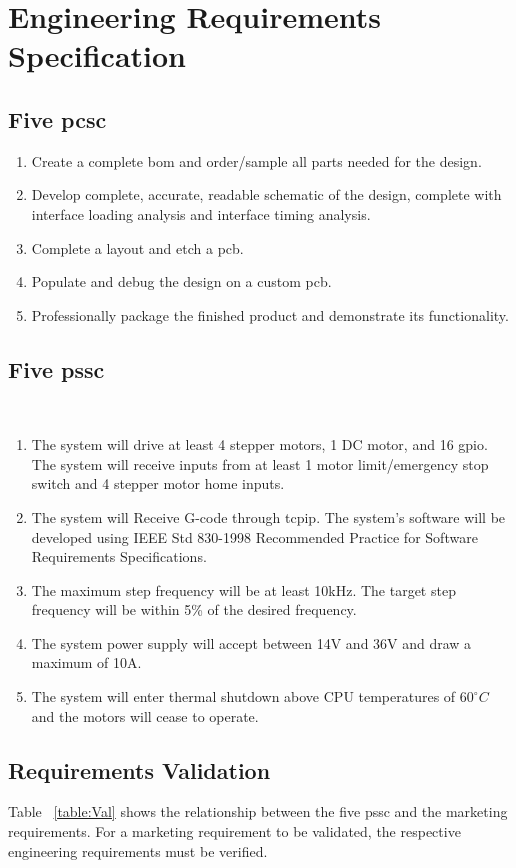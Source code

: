\chapter{Engineering Requirements Specification}

\section{Five \gls{pcsc}}
\begin{enumerate}
	\item Create a complete \gls{bom} and order/sample all parts needed for the design.
	\item Develop complete, accurate, readable schematic of the design, complete with interface loading analysis and interface timing analysis. 
	\item Complete a layout and etch a \gls{pcb}.
	\item Populate and debug the design on a custom \gls{pcb}.
	\item Professionally package the finished product and demonstrate its functionality.
\end{enumerate}

\section{Five \gls{pssc}}\
\begin{enumerate}
	\item The system will drive at least 4 stepper motors, 1 DC motor, and 16 \gls{gpio}.
The system will receive inputs from at least 1 motor limit/emergency stop switch and 4 stepper motor home inputs.
	\item The system will Receive G-code through \gls{tcpip}.
The system’s software will be developed using IEEE Std 830-1998 Recommended Practice for Software Requirements Specifications.
	\item The maximum step frequency will be at least 10kHz.
The target step frequency will be within 5\% of the desired frequency.
	\item The system power supply will accept between 14V and 36V and draw a maximum of 10A.
	\item The system will enter thermal shutdown above CPU temperatures of $60^{\circ}C$ and the motors will cease to operate.
\end{enumerate}

\section{Requirements Validation}
Table ~\ref{table:Val} shows the relationship between the five \gls{pssc} and the marketing requirements.
For a marketing requirement to be validated, the respective engineering requirements must be verified.

